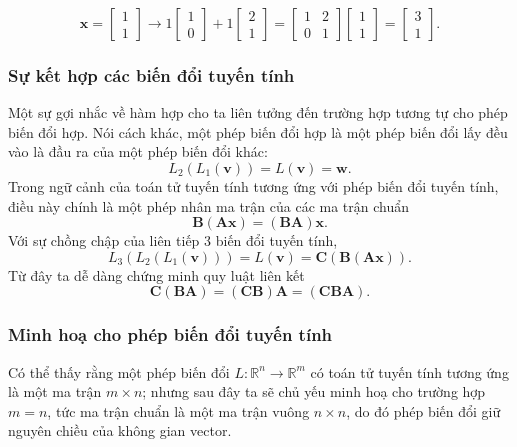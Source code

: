 \[\mathbf{x}=\begin{bmatrix}
1\\1
\end{bmatrix}\rightarrow 1\begin{bmatrix}
1\\0
\end{bmatrix}+1\begin{bmatrix}
2\\1
\end{bmatrix}=\begin{bmatrix}
    1&2\\0&1
\end{bmatrix}\begin{bmatrix}
    1\\1
\end{bmatrix}=\begin{bmatrix}
    3\\1
\end{bmatrix}.\]
\subsubsection*{Sự kết hợp các biến đổi tuyến tính}
Một sự gợi nhắc về hàm hợp cho ta liên tưởng đến trường hợp tương tự cho phép biến đổi hợp. Nói cách khác, một phép biến đổi hợp là một phép biến đổi lấy đều vào là đầu ra của một phép biến đổi khác:
\[L_2 (L_1 (\mathbf{v}))=L(\mathbf{v})=\mathbf{w}.\] Trong ngữ cảnh của toán tử tuyến tính tương ứng với phép biến đổi tuyến tính, điều này chính là một phép nhân ma trận của các ma trận chuẩn
\[\mathbf{B}(\mathbf{A}\mathbf{x})=(\mathbf{BA})\mathbf{x}.\]
Với sự chồng chập của liên tiếp 3 biến đổi tuyến tính,
\[L_3 (L_2 (L_1 (\mathbf{v})))=L(\mathbf{v})=\mathbf{C}(\mathbf{B}(\mathbf{A}\mathbf{x})).\] Từ đây ta dễ dàng chứng minh quy luật liên kết
\[\mathbf{C}(\mathbf{BA})=(\mathbf{CB})\mathbf{A}=(\mathbf{C}\mathbf{B}\mathbf{A}).\]
\subsubsection*{Minh hoạ cho phép biến đổi tuyến tính}
Có thể thấy rằng một phép biến đổi \(L: \mathbb{R}^n \rightarrow \mathbb{R}^m\) có toán tử tuyến tính tương ứng là một ma trận \(m\times n\); nhưng
sau đây ta sẽ chủ yếu minh hoạ cho trường hợp \(m=n\), tức ma trận chuẩn là một ma trận vuông \(n\times n\), do đó phép biến đổi giữ nguyên chiều của không gian vector.

